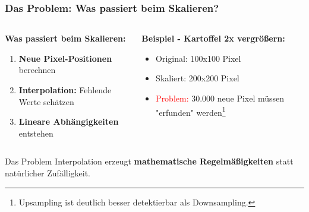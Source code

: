 \documentclass[11pt,t,usepdftitle=false,aspectratio=169]{beamer}
\begin{document}
\begin{frame}
	\frametitle{Das Problem: Was passiert beim Skalieren?}
	\begin{columns}[T]
		\begin{column}{0.48\textwidth}
			\textbf{Was passiert beim Skalieren:}
			\begin{enumerate}
				\item \textbf{Neue Pixel-Positionen} berechnen
				\item \textbf{Interpolation:} Fehlende Werte schätzen
				\item \textbf{Lineare Abhängigkeiten} entstehen
			\end{enumerate}
		\end{column}
		\begin{column}{0.48\textwidth}
			\textbf{Beispiel - Kartoffel 2x vergrößern:}
			\begin{itemize}
				\item Original: 100x100 Pixel
				\item Skaliert: 200x200 Pixel  
				\item \textcolor{red}{Problem:} 30.000 neue Pixel müssen "erfunden" werden\footnote{Upsampling ist deutlich besser detektierbar als Downsampling.}
			\end{itemize}
		\end{column}
	\end{columns}
	
	\vspace{0.5em}
	\begin{alertblock}{Das Problem}
		Interpolation erzeugt \textbf{mathematische Regelmäßigkeiten} statt natürlicher Zufälligkeit.
	\end{alertblock}
\end{frame}
\end{document}
